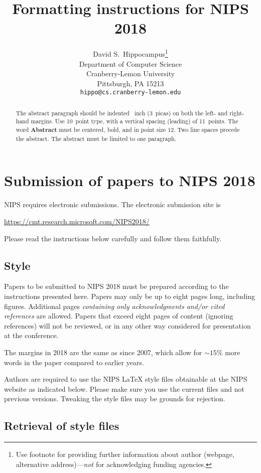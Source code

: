 \documentclass{article}
\title{Formatting instructions for NIPS 2018}
\author{
	David S.~Hippocampus\thanks{Use footnote for providing further
		information about author (webpage, alternative
		address)---\emph{not} for acknowledging funding agencies.} \\
	Department of Computer Science\\
	Cranberry-Lemon University\\
	Pittsburgh, PA 15213 \\
	\texttt{hippo@cs.cranberry-lemon.edu} \\
}
\begin{document}
	
	\maketitle
	
	\begin{abstract}
		The abstract paragraph should be indented ~inch
		(3~picas) on both the left- and right-hand margins. Use 10~point
		type, with a vertical spacing (leading) of 11~points.  The word
		\textbf{Abstract} must be centered, bold, and in point size 12. Two
		line spaces precede the abstract. The abstract must be limited to
		one paragraph.
	\end{abstract}
	
	\section{Submission of papers to NIPS 2018}
	
	NIPS requires electronic submissions.  The electronic submission site
	is
	\begin{center}
		\url{https://cmt.research.microsoft.com/NIPS2018/}
	\end{center}
	
	Please read the instructions below carefully and follow them faithfully.
	
	\subsection{Style}
	
	Papers to be submitted to NIPS 2018 must be prepared according to the
	instructions presented here. Papers may only be up to eight pages
	long, including figures. Additional pages \emph{containing only
		acknowledgments and/or cited references} are allowed. Papers that
	exceed eight pages of content (ignoring references) will not be
	reviewed, or in any other way considered for presentation at the
	conference.
	
	The margins in 2018 are the same as since 2007, which allow for
	$\sim$$15\%$ more words in the paper compared to earlier years.
	
	Authors are required to use the NIPS \LaTeX{} style files obtainable
	at the NIPS website as indicated below. Please make sure you use the
	current files and not previous versions. Tweaking the style files may
	be grounds for rejection.
	
	\subsection{Retrieval of style files}
	
\end{document}

